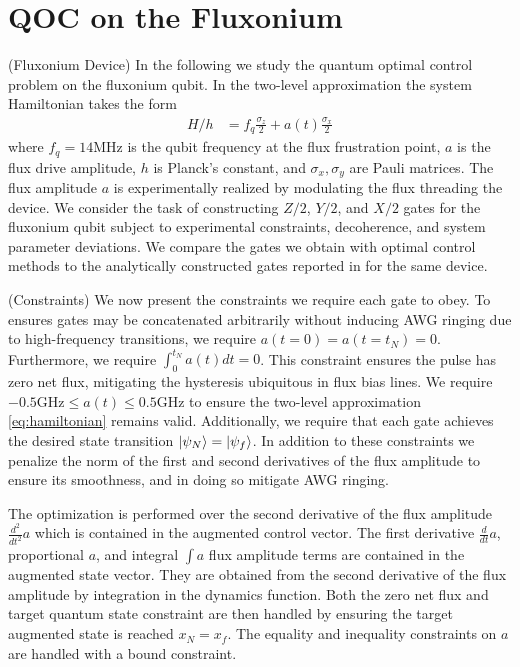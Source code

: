 \documentclass[
  amsfonts,
  amsmath,
  tbtags,
  amssymb,
  aps,
  nobibnotes,
  twocolumn,
  superscriptaddress,
]{revtex4-2}
\begin{document}
\section{QOC on the Fluxonium}
(Fluxonium Device) In the following we study
the quantum optimal control problem on the fluxonium qubit.
In the two-level
approximation the system Hamiltonian takes the form
\label{eq:hamiltonian}
\begin{align}
  H/h &= f_{q} \frac{\sigma_{z}}{2} + a(t) \frac{\sigma_{x}}{2}
\end{align}
where $f_{q} = 14$MHz is the qubit frequency at the flux frustration point,
$a$ is the flux drive amplitude, $h$ is Planck's constant, and $\sigma_{x}, \sigma_{y}$
are Pauli matrices. The flux amplitude $a$ is experimentally
realized by modulating the flux 
threading the device. We consider the task of constructing $Z/2$, $Y/2$, and $X/2$
gates for the fluxonium qubit subject to experimental constraints, decoherence, and
system parameter deviations. We compare the gates we obtain with optimal
control methods to the analytically constructed gates reported in
\cite{zhang2020universal} for the same device.

(Constraints) We now present the constraints we require each gate
to obey.
To ensures gates may be concatenated arbitrarily without
inducing AWG ringing due to high-frequency transitions,
we require $a(t = 0) = a(t = t_{N}) = 0$.
Furthermore, we require $\int_{0}^{t_{N}} a(t) dt = 0$. This
constraint ensures the pulse has zero net flux, mitigating
the hysteresis ubiquitous in flux bias lines.
We require $-0.5 \textrm{GHz} \le a(t) \le 0.5 \textrm{GHz}$
to ensure the two-level approximation \ref{eq:hamiltonian}
remains valid. Additionally, we require that each gate achieves
the desired state transition $\ket{\psi_{N}} = \ket{\psi_{f}}$.
In addition to these constraints we penalize the norm
of the first and second derivatives of the flux amplitude to
ensure its smoothness, and in doing so mitigate AWG ringing.

The optimization is performed over the second derivative of the flux amplitude
$\frac{d^{2}}{dt^{2}} a$ which is contained in the
augmented control vector. The first derivative
$\frac{d}{dt} a$, proportional $a$, and integral $\int a$
flux amplitude terms
are contained in the augmented state vector. They are obtained from
the second derivative of the flux amplitude by
integration in the dynamics function.
Both the zero net flux and target quantum state constraint
are then handled by ensuring the target augmented state is
reached $x_{N} = x_{f}$.
The equality and inequality constraints on $a$ are handled
with a bound constraint.
\end{document}
